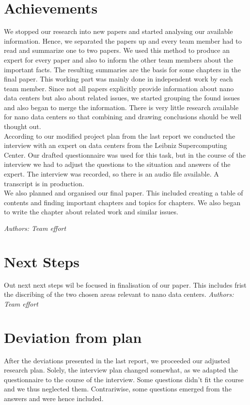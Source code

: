 \documentclass[sigchi-a, authorversion]{acmart}
\begin{document}
\section{Achievements}
We stopped our research into new papers and started analysing our available information. Hence, we separated the papers up and every team member had to read and summarize one to two papers. We used this method to produce an expert for every paper and also to inform the other team members about the important facts. The resulting summaries are the basis for some chapters in the final paper. This working part was mainly done in independent work by each team member. Since not all papers explicitly provide information about nano data centers but also about related issues, we started grouping the found issues and also began to merge the information. There is very little research available for nano data centers so that combining and drawing conclusions should be well thought out.\\  
According to our modified project plan from the last report we conducted the interview with an expert on data centers from the Leibniz Supercomputing Center. Our drafted questionnaire was used for this task, but in the course of the interview we had to adjust the questions to the situation and answers of the expert. The interview was recorded, so there is an audio file available. A transcript is in production.\\
We also planned and organised our final paper. This included creating a table of contents and finding important chapters and topics for chapters. We also began to write the chapter about related work and similar issues.

\textit{Authors: Team effort}\\

\section{Next Steps}
Out next next steps wil be focused in finalisation of our paper. This includes frist the discribing of the two chosen areas relevant to nano data centers.
\textit{Authors: Team effort}\\

\section{Deviation from plan}
After the deviations presented in the last report, we proceeded our adjusted research plan. Solely, the interview plan changed somewhat, as we adapted the questionnaire to the course of the interview. Some questions didn't fit the course and we thus neglected them. Contrariwise, some questions emerged from the answers and were hence included. 
\end{document}
